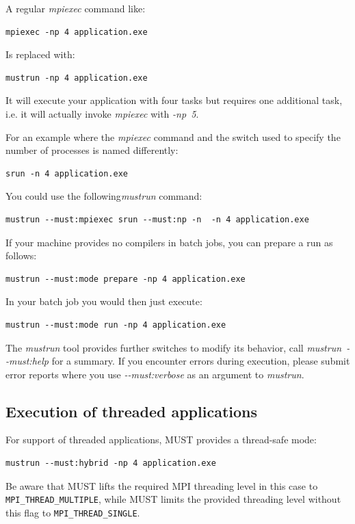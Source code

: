 \documentclass[english]{scrartcl}
\begin{document}
A regular \emph{mpiexec} command like:
\begin{verbatim}
mpiexec -np 4 application.exe
\end{verbatim}
Is replaced with:
\begin{verbatim}
mustrun -np 4 application.exe
\end{verbatim}
It will execute your application with four tasks but requires one additional task,
i.e. it will actually invoke \emph{mpiexec} with \emph{\mbox{-np 5}}.

For an example where the \emph{mpiexec} command and the switch used to
specify the number of processes is named differently:
\begin{verbatim}
srun -n 4 application.exe
\end{verbatim}
You could use the following\emph{mustrun} command:
\begin{verbatim}
mustrun --must:mpiexec srun --must:np -n  -n 4 application.exe
\end{verbatim}

\noindent{}If your machine provides no compilers in batch jobs, you can prepare
a run as follows:
\begin{verbatim}
mustrun --must:mode prepare -np 4 application.exe
\end{verbatim}
In your batch job you would then just execute:
\begin{verbatim}
mustrun --must:mode run -np 4 application.exe
\end{verbatim}

\noindent{}The \emph{mustrun} tool provides further switches to modify its
behavior, call \mbox{\emph{mustrun \mbox{-{}-must:help}}} for a summary.  
If you
encounter errors during execution, please submit error reports where you use \emph{\mbox{-{}-must:verbose}} as
an argument to \emph{mustrun}.

\subsection{Execution of threaded applications}
\label{section:threaded_apps}
For support of threaded applications, MUST provides a thread-safe mode:
\begin{verbatim}
mustrun --must:hybrid -np 4 application.exe
\end{verbatim}
Be aware that MUST lifts the required MPI threading level in this case to
\texttt{MPI\_THREAD\_MULTIPLE}, while MUST limits the provided threading level without
this flag to \texttt{MPI\_THREAD\_SINGLE}.
\end{document}
